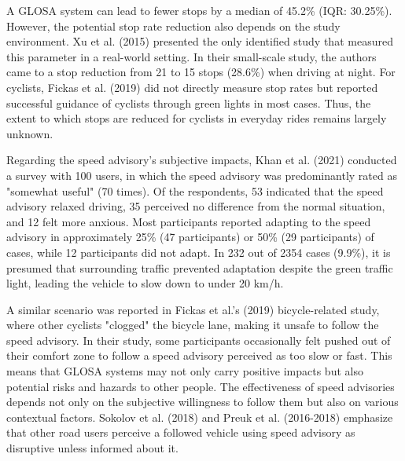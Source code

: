 A GLOSA system can lead to fewer stops by a median of 45.2\% (IQR: 30.25\%). However, the potential stop rate reduction also depends on the study environment. Xu et al. (2015) \cite{xu_bb_2015} presented the only identified study that measured this parameter in a real-world setting. In their small-scale study, the authors came to a stop reduction from 21 to 15 stops (28.6\%) when driving at night. For cyclists, Fickas et al. (2019) \cite{fickas_fast_2019} did not directly measure stop rates but reported successful guidance of cyclists through green lights in most cases. Thus, the extent to which stops are reduced for cyclists in everyday rides remains largely unknown.

Regarding the speed advisory's subjective impacts, Khan et al. (2021) \cite{khan_eco-drive_2021} conducted a survey with 100 users, in which the speed advisory was predominantly rated as "somewhat useful" (70 times). Of the respondents, 53 indicated that the speed advisory relaxed driving, 35 perceived no difference from the normal situation, and 12 felt more anxious. Most participants reported adapting to the speed advisory in approximately 25\% (47 participants) or 50\% (29 participants) of cases, while 12 participants did not adapt. In 232 out of 2354 cases (9.9\%), it is presumed that surrounding traffic prevented adaptation despite the green traffic light, leading the vehicle to slow down to under 20 km/h. 

A similar scenario was reported in Fickas et al.'s (2019) \cite{fickas_fast_2019} bicycle-related study, where other cyclists "clogged" the bicycle lane, making it unsafe to follow the speed advisory. In their study, some participants occasionally felt pushed out of their comfort zone to follow a speed advisory perceived as too slow or fast. This means that GLOSA systems may not only carry positive impacts but also potential risks and hazards to other people. The effectiveness of speed advisories depends not only on the subjective willingness to follow them but also on various contextual factors. Sokolov et al. (2018) \cite{sokolov_effects_2018} and Preuk et al. (2016-2018) \cite{preuk_does_2016, preuk_should_2018} emphasize that other road users perceive a followed vehicle using speed advisory as disruptive unless informed about it.

